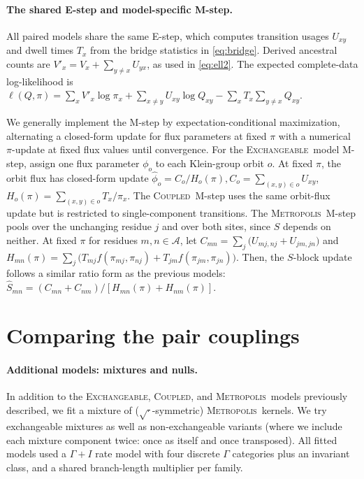\documentclass{article}
\newcommand{\CTMC}{\textsc{ctmc}}
\newcommand{\Coupledm}{\textsc{Coupled}}
\newcommand{\Exchm}{\textsc{Exchangeable}}
\newcommand{\Metrop}{\textsc{Metropolis}}
\newcommand{\Xset}{\mathcal{A}}
\begin{document}
\paragraph{The shared E-step and model-specific M-step.} All paired models share the 
same E-step, which computes transition usages $U_{xy}$ and dwell times $T_x$
from the bridge statistics in \eqref{eq:bridge}. 
Derived ancestral counts are $V'_x=V_x+\sum_{y\ne x}U_{yx}$, as used in \eqref{eq:ell2}. 
The expected complete-data log-likelihood is $\ell(Q, \pi) = \sum_x
V'_x\log\pi_x + \sum_{x\ne y}U_{xy}\log Q_{xy}-\sum_xT_x\!\sum_{y \neq x}Q_{xy}$.

We generally implement the M-step by expectation-conditional maximization, alternating a 
closed-form update for flux parameters at fixed $\pi$ with a numerical $\pi$-update at fixed 
flux values until convergence. 
For the \Exchm\ model M-step, assign one flux parameter $\phi_o$ to each Klein-group orbit $o$. 
At fixed $\pi$, the orbit flux has closed-form update 
$\widehat\phi_o=C_o/H_o(\pi), C_o=\sum_{(x,y)\in o}U_{xy}$, $H_o(\pi)=\sum_{(x,y)\in o} T_x/\pi_x$.
The \Coupledm\ M-step uses the same orbit-flux update but is restricted to 
single-component transitions.
The \Metrop\ M-step pools over the unchanging residue $j$ and over both sites,
since $S$ depends on neither. At fixed $\pi$ for residues $m,n \in \Xset$, let 
$C_{mn}=\sum_j\big(U_{mj,nj}+U_{jm,jn}\big)$ 
and $H_{mn}(\pi)=\sum_j\big(T_{mj}f(\pi_{mj},\pi_{nj})+T_{jm}f(\pi_{jm},\pi_{jn})\big)$. 
Then, the $S$-block update follows a similar ratio form as the previous models: 
$\widehat S_{mn}=(C_{mn}{+}C_{nm})/[H_{mn}(\pi){+}H_{nm}(\pi)]$.


\section{Comparing the pair couplings}
\label{sec:paircompare}
\paragraph{Additional models: mixtures and nulls.} In addition to the \Exchm, \Coupledm, and \Metrop\ 
models previously described, we fit a mixture of ($\sqrt{\cdot}$-symmetric) \Metrop\ kernels. We try 
exchangeable mixtures as well as non-exchangeable variants (where we include each mixture component 
twice: once as itself and once transposed).
All fitted models used a $\Gamma+I$ rate model with four discrete $\Gamma$ categories plus an invariant class, 
and a shared branch-length multiplier per family.
\end{document}
